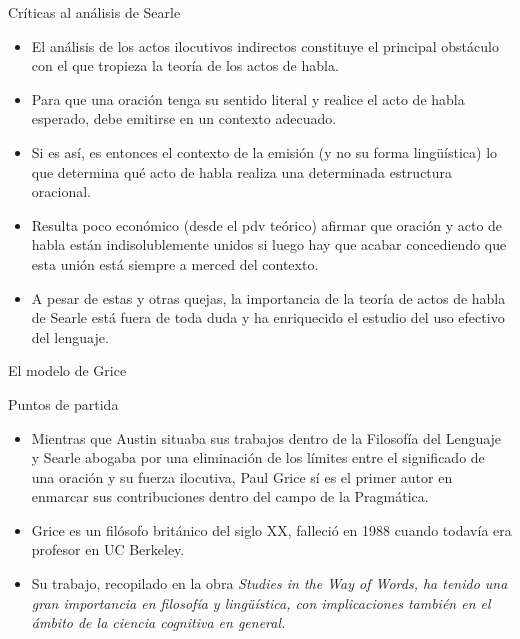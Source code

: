 \documentclass{beamer}
\begin{document}
\begin{frame}{Críticas al análisis de Searle}

	\begin{itemize}
		\item El análisis de los actos ilocutivos indirectos constituye el principal obstáculo con el que tropieza la teoría de los actos de habla. 
		\item Para que una oración tenga su sentido literal y realice el acto de habla esperado, debe emitirse en un contexto adecuado. 
		\item Si es así, es entonces el contexto de la emisión (y no su forma lingüística) lo que determina qué acto de habla realiza una determinada estructura oracional. 
		\item Resulta poco económico (desde el pdv teórico) afirmar que oración y acto de habla están indisolublemente unidos si luego hay que acabar concediendo que esta unión está siempre a merced del contexto.
		\item A pesar de estas y otras quejas, la importancia de la teoría de actos de habla de Searle está fuera de toda duda y ha enriquecido el estudio del uso efectivo del lenguaje. 
	\end{itemize}

\end{frame}

\begin{frame}{}
\begin{center}
  \LARGE{El modelo de Grice}
\end{center} 
\end{frame}

\begin{frame}{Puntos de partida}

\begin{itemize}
	\item Mientras que Austin situaba sus trabajos dentro de la Filosofía del Lenguaje y Searle abogaba por una eliminación de los límites entre el significado de una oración y su fuerza ilocutiva, Paul Grice sí es el primer autor en enmarcar sus contribuciones dentro del campo de la Pragmática.
	\item Grice es un filósofo británico del siglo XX, falleció en 1988 cuando todavía era profesor en UC Berkeley. 
	\item Su trabajo, recopilado en la obra \it{Studies in the Way of Words}, ha tenido una gran importancia en filosofía y lingüística, con implicaciones también en el ámbito de la ciencia cognitiva en general.
\end{itemize}

\end{frame}
\end{document}
